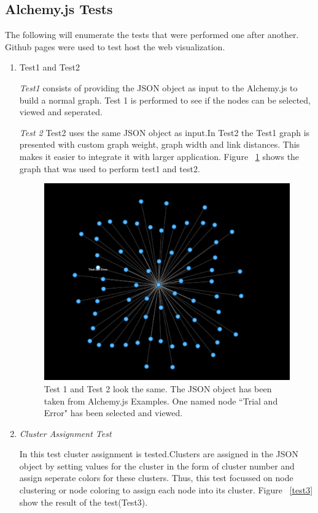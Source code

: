 \subsection{Alchemy.js Tests}
The following will enumerate the tests that were performed one after another. Github pages were used to test host the web visualization.

\begin{enumerate}
\item Test1 and Test2
\par \textit{Test1} consists of providing the JSON object as input to the Alchemy.js to build a normal graph. Test 1 is performed to see if the nodes can be selected, viewed and seperated.
\par \textit{Test 2} Test2 uses the same JSON object as input.In Test2 the Test1 graph is presented with custom graph weight, graph width and link distances. This makes it easier to integrate it with larger application. Figure ~\ref{test1} shows the graph that was used to perform test1 and test2.

\begin{figure}[H]
\centering
\includegraphics[scale=0.3]{t1.png}
\caption{\label{test1}Test 1 and Test 2 look the same. The JSON object has been taken from Alchemy.js Examples. One named node ``Trial and Error" has been selected and viewed.}
\end{figure}

\item \textit{Cluster Assignment Test}
\par In this test cluster assignment is tested.Clusters are assigned in the JSON object by setting values for the cluster in the form of cluster number and assign seperate colors for these clusters.	Thus, this test focussed on node clustering or node coloring to assign each node into its cluster. Figure ~\ref{test3} show the result of the test(Test3). 


\end{enumerate}
